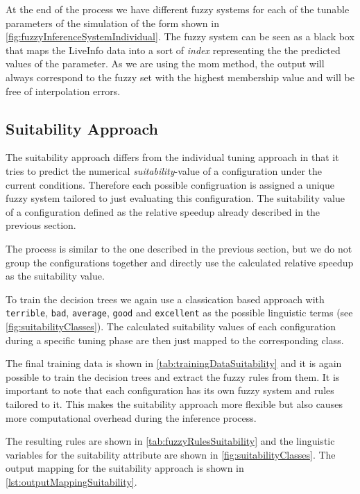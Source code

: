At the end of the process we have different fuzzy systems for each of the tunable parameters of the simulation of the form shown in \autoref{fig:fuzzyInferenceSystemIndividual}. The fuzzy system can be seen as a black box that maps the LiveInfo data into a sort of \emph{index} representing the the predicted values of the parameter. As we are using the \gls{mom} method, the output will always correspond to the fuzzy set with the highest membership value and will be free of interpolation errors.


\subsection{Suitability Approach}

The suitability approach differs from the individual tuning approach in that it tries to predict the numerical \emph{suitability}-value of a configuration under the current conditions. Therefore each possible configruation is assigned a unique fuzzy system tailored to just evaluating this configuration. The suitability value of a configuration defined as the relative speedup already described in the previous section.

The process is similar to the one described in the previous section, but we do not group the configurations together and directly use the calculated relative speedup as the suitability value.

To train the decision trees we again use a classication based approach with \texttt{terrible}, \texttt{bad}, \texttt{average}, \texttt{good} and \texttt{excellent} as the possible linguistic terms (see \autoref{fig:suitabilityClasses}). The calculated suitability values of each configuration during a specific tuning phase are then just mapped to the corresponding class.

The final training data is shown in \autoref{tab:trainingDataSuitability} and it is again possible to train the decision trees and extract the fuzzy rules from them. It is important to note that each configuration has its own fuzzy system and rules tailored to it. This makes the suitability approach more flexible but also causes more computational overhead during the inference process.

The resulting rules are shown in \autoref{tab:fuzzyRulesSuitability} and the linguistic variables for the suitability attribute are shown in \autoref{fig:suitabilityClasses}. The output mapping for the suitability approach is shown in \autoref{lst:outputMappingSuitability}.

